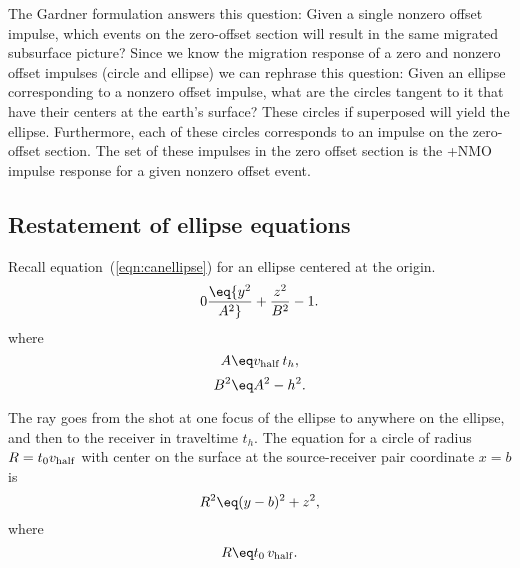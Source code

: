 \par
The Gardner formulation answers this question:
Given a single nonzero offset impulse,
which events on the zero-offset section
will result in the same migrated subsurface picture?
Since we know the migration response
of a zero and nonzero offset impulses (circle and ellipse)
we can rephrase this question:
Given an ellipse corresponding
to a nonzero offset impulse,
what are the circles tangent to it
that have their centers at the earth's surface?
These circles if superposed will yield the ellipse.
Furthermore,
each of these circles corresponds
to an impulse on the zero-offset section.
The set of these impulses in the zero offset section
is the +NMO impulse response for a given nonzero offset event.


\subsection{Restatement of ellipse equations}
Recall equation~(\ref{eqn:canellipse})
for an ellipse centered at the origin.
\begin{equation}
        \label{eqn:ellipse}
	0 \eq {y^{2}\over{A^{2}}} + {z^{2}\over{B^{2}}} -1 .
\end{equation}
where
\begin{equation}
        \label{eqn:ellipseA}
	A \eq  \vhalf\, t_h ,
\end{equation}
\begin{equation}
        \label{eqn:ellipseB}
	B^2 \eq A^2 - h^2 .
\end{equation}

The ray goes from the shot at one focus of the ellipse
to anywhere on the ellipse,
and then to the receiver in traveltime $t_h$.
The equation for a circle of radius $R=t_0 v_{\rm half}$
with center on the surface
at the source-receiver pair coordinate $x=b$ is
\begin{equation}
        \label{eqn:circle}
	R^2 \eq (y - b)^2 + z^{2} ,
\end{equation}
\noindent
where
\begin{equation}
	\label{eqn:radius}
        R \eq t_0 \, \vhalf .
\end{equation}

